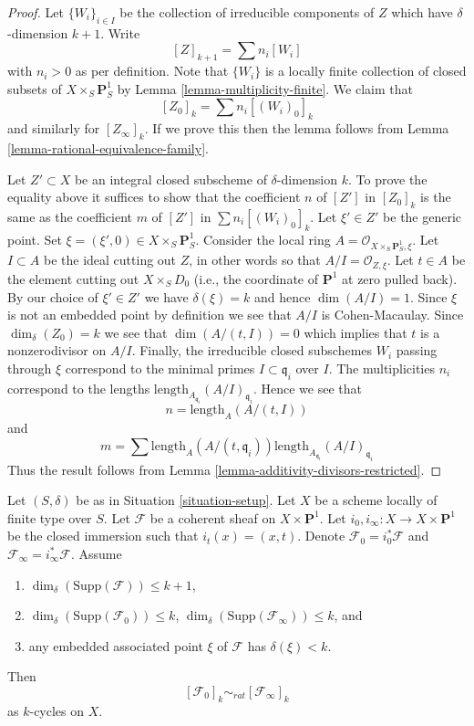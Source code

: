 \begin{proof}
Let $\{W_i\}_{i \in I}$ be the collection of irreducible
components of $Z$ which have $\delta$-dimension $k + 1$.
Write
$$
[Z]_{k + 1} = \sum n_i[W_i]
$$
with $n_i > 0$ as per definition. Note that $\{W_i\}$
is a locally finite collection of closed subsets of
$X \times_S \mathbf{P}^1_S$ by Lemma \ref{lemma-multiplicity-finite}.
We claim that
$$
[Z_0]_k = \sum n_i[(W_i)_0]_k
$$
and similarly for $[Z_\infty]_k$. If we prove this then the lemma
follows from Lemma \ref{lemma-rational-equivalence-family}.

\medskip\noindent
Let $Z' \subset X$ be an integral closed subscheme of $\delta$-dimension $k$.
To prove the equality above it suffices to show that the coefficient $n$
of $[Z']$ in $[Z_0]_k$ is the same as the coefficient $m$ of
$[Z']$ in $\sum n_i[(W_i)_0]_k$. Let $\xi' \in Z'$ be the generic point.
Set $\xi = (\xi', 0) \in  X \times_S \mathbf{P}^1_S$.
Consider the local ring $A = \mathcal{O}_{X \times_S \mathbf{P}^1_S, \xi}$.
Let $I \subset A$ be the ideal cutting out $Z$, in other words so that
$A/I = \mathcal{O}_{Z, \xi}$. Let $t \in A$ be the element cutting
out $X \times_S D_0$ (i.e., the coordinate of $\mathbf{P}^1$ at zero
pulled back). By our choice of $\xi' \in Z'$ we have $\delta(\xi) = k$
and hence $\dim(A/I) = 1$. Since $\xi$ is not an embedded point by
definition we see that $A/I$ is Cohen-Macaulay. Since $\dim_\delta(Z_0)
= k$ we see that $\dim(A/(t, I)) = 0$ which implies that $t$
is a nonzerodivisor on $A/I$. Finally, the irreducible closed subschemes
$W_i$ passing through $\xi$ correspond to the minimal primes
$I \subset \mathfrak q_i$ over $I$. The multiplicities $n_i$ correspond
to the lengths $\text{length}_{A_{\mathfrak q_i}}(A/I)_{\mathfrak q_i}$.
Hence we see that
$$
n = \text{length}_A(A/(t, I))
$$
and
$$
m = \sum
\text{length}_A(A/(t, \mathfrak q_i))
\text{length}_{A_{\mathfrak q_i}}(A/I)_{\mathfrak q_i}
$$
Thus the result follows from
Lemma \ref{lemma-additivity-divisors-restricted}.
\end{proof}

\begin{lemma}
\label{lemma-coherent-sheaf-cross-p1}
Let $(S, \delta)$ be as in Situation \ref{situation-setup}.
Let $X$ be a scheme locally of finite type over $S$.
Let $\mathcal{F}$ be a coherent sheaf on $X \times \mathbf{P}^1$.
Let $i_0, i_\infty : X \to X \times \mathbf{P}^1$ be the closed immersion
such that $i_t(x) = (x, t)$. Denote $\mathcal{F}_0 = i_0^*\mathcal{F}$ and
$\mathcal{F}_\infty = i_\infty^*\mathcal{F}$.
Assume
\begin{enumerate}
\item $\dim_\delta(\text{Supp}(\mathcal{F})) \leq k + 1$,
\item $\dim_\delta(\text{Supp}(\mathcal{F}_0)) \leq k$,
$\dim_\delta(\text{Supp}(\mathcal{F}_\infty)) \leq k$, and
\item any embedded associated point $\xi$ of $\mathcal{F}$ has
$\delta(\xi) < k$.
\end{enumerate}
Then
$$
[\mathcal{F}_0]_k \sim_{rat} [\mathcal{F}_\infty]_k
$$
as $k$-cycles on $X$.
\end{lemma}

